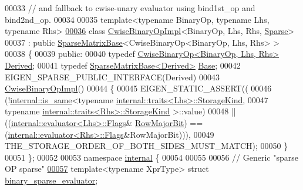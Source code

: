 \begin{DoxyCode}
00033 \textcolor{comment}{//      and fallback to cwise-unary evaluator using bind1st\_op and bind2nd\_op.}
00034 
00035 \textcolor{keyword}{template}<\textcolor{keyword}{typename} BinaryOp, \textcolor{keyword}{typename} Lhs, \textcolor{keyword}{typename} Rhs>
\hyperlink{class_eigen_1_1_cwise_binary_op_impl_3_01_binary_op_00_01_lhs_00_01_rhs_00_01_sparse_01_4}{00036} \textcolor{keyword}{class }\hyperlink{class_eigen_1_1_cwise_binary_op_impl}{CwiseBinaryOpImpl}<BinaryOp, Lhs, Rhs, \hyperlink{struct_eigen_1_1_sparse}{Sparse}>
00037   : \textcolor{keyword}{public} \hyperlink{group___sparse_core___module_class_eigen_1_1_sparse_matrix_base}{SparseMatrixBase}<CwiseBinaryOp<BinaryOp, Lhs, Rhs> >
00038 \{
00039   \textcolor{keyword}{public}:
00040     \textcolor{keyword}{typedef} \hyperlink{group___core___module_class_eigen_1_1_cwise_binary_op}{CwiseBinaryOp<BinaryOp, Lhs, Rhs>} 
      \hyperlink{group___core___module_class_eigen_1_1_cwise_binary_op}{Derived};
00041     \textcolor{keyword}{typedef} \hyperlink{group___sparse_core___module_class_eigen_1_1_sparse_matrix_base}{SparseMatrixBase<Derived>} \hyperlink{group___sparse_core___module_class_eigen_1_1_sparse_matrix_base}{Base};
00042     EIGEN\_SPARSE\_PUBLIC\_INTERFACE(Derived)
00043     \hyperlink{class_eigen_1_1_cwise_binary_op_impl}{CwiseBinaryOpImpl}()
00044     \{
00045       EIGEN\_STATIC\_ASSERT((
00046                 (!\hyperlink{struct_eigen_1_1internal_1_1is__same}{internal::is\_same}<\textcolor{keyword}{typename} 
      \hyperlink{struct_eigen_1_1internal_1_1traits}{internal::traits<Lhs>::StorageKind},
00047                                     \textcolor{keyword}{typename} \hyperlink{struct_eigen_1_1internal_1_1traits}{internal::traits<Rhs>::StorageKind}
      >::value)
00048             ||  ((\hyperlink{struct_eigen_1_1internal_1_1evaluator}{internal::evaluator<Lhs>::Flags}&
      \hyperlink{group__flags_gae4f56c2a60bbe4bd2e44c5b19cbe8762}{RowMajorBit}) == (\hyperlink{struct_eigen_1_1internal_1_1evaluator}{internal::evaluator<Rhs>::Flags}&RowMajorBit))),
00049             THE\_STORAGE\_ORDER\_OF\_BOTH\_SIDES\_MUST\_MATCH);
00050     \}
00051 \};
00052 
00053 \textcolor{keyword}{namespace }\hyperlink{namespaceinternal}{internal} \{
00054 
00055   
00056 \textcolor{comment}{// Generic "sparse OP sparse"}
\hyperlink{struct_eigen_1_1internal_1_1binary__sparse__evaluator}{00057} \textcolor{keyword}{template}<\textcolor{keyword}{typename} XprType> \textcolor{keyword}{struct }\hyperlink{struct_eigen_1_1internal_1_1binary__sparse__evaluator}{binary\_sparse\_evaluator};

\end{DoxyCode}
